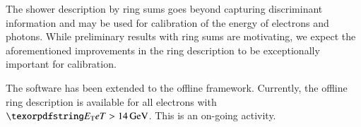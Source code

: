 The shower description by ring sums goes beyond capturing discriminant
information and may be used for calibration of the energy of electrons and
photons. While preliminary results with ring sums are motivating, we expect the aforementioned
improvements in the ring description to be exceptionally important for
calibration.

The \rnn{} software has been extended to the offline framework. Currently,
the offline ring description is available for all electrons with $\et>\SI{14}{\GeV}$. This is an on-going activity.


